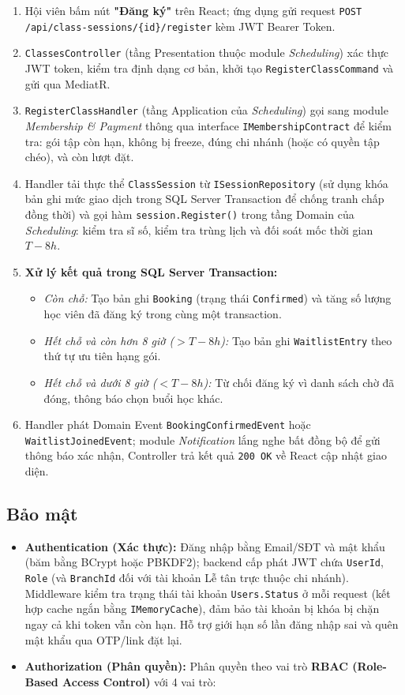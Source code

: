 \documentclass[a4paper,12pt]{article}
\begin{document}
\begin{enumerate}
    \item Hội viên bấm nút \textbf{"Đăng ký"} trên React; ứng dụng gửi request \texttt{POST /api/class-sessions/\{id\}/register} kèm JWT Bearer Token.
    \item \texttt{ClassesController} (tầng Presentation thuộc module \textit{Scheduling}) xác thực JWT token, kiểm tra định dạng cơ bản, khởi tạo \texttt{RegisterClassCommand} và gửi qua MediatR.
    \item \texttt{RegisterClassHandler} (tầng Application của \textit{Scheduling}) gọi sang module \textit{Membership \& Payment} thông qua interface \texttt{IMembershipContract} để kiểm tra: gói tập còn hạn, không bị freeze, đúng chi nhánh (hoặc có quyền tập chéo), và còn lượt đặt.
    \item Handler tải thực thể \texttt{ClassSession} từ \texttt{ISessionRepository} (sử dụng khóa bản ghi mức giao dịch trong SQL Server Transaction để chống tranh chấp đồng thời) và gọi hàm \texttt{session.Register()} trong tầng Domain của \textit{Scheduling}: kiểm tra sĩ số, kiểm tra trùng lịch và đối soát mốc thời gian $T-8h$.
    \item \textbf{Xử lý kết quả trong SQL Server Transaction:}
    \begin{itemize}
        \item \textit{Còn chỗ:} Tạo bản ghi \texttt{Booking} (trạng thái \texttt{Confirmed}) và tăng số lượng học viên đã đăng ký trong cùng một transaction.
        \item \textit{Hết chỗ và còn hơn 8 giờ ($> T-8h$):} Tạo bản ghi \texttt{WaitlistEntry} theo thứ tự ưu tiên hạng gói.
        \item \textit{Hết chỗ và dưới 8 giờ ($< T-8h$):} Từ chối đăng ký vì danh sách chờ đã đóng, thông báo chọn buổi học khác.
    \end{itemize}
    \item Handler phát Domain Event \texttt{BookingConfirmedEvent} hoặc \texttt{WaitlistJoinedEvent}; module \textit{Notification} lắng nghe bất đồng bộ để gửi thông báo xác nhận, Controller trả kết quả \texttt{200 OK} về React cập nhật giao diện.
\end{enumerate}

\subsection{Bảo mật}
\begin{itemize}
    \item \textbf{Authentication (Xác thực):} Đăng nhập bằng Email/SĐT và mật khẩu (băm bằng BCrypt hoặc PBKDF2); backend cấp phát JWT chứa \texttt{UserId}, \texttt{Role} (và \texttt{BranchId} đối với tài khoản Lễ tân trực thuộc chi nhánh). Middleware kiểm tra trạng thái tài khoản \texttt{Users.Status} ở mỗi request (kết hợp cache ngắn bằng \texttt{IMemoryCache}), đảm bảo tài khoản bị khóa bị chặn ngay cả khi token vẫn còn hạn. Hỗ trợ giới hạn số lần đăng nhập sai và quên mật khẩu qua OTP/link đặt lại.
    \item \textbf{Authorization (Phân quyền):} Phân quyền theo vai trò \textbf{RBAC (Role-Based Access Control)} với 4 vai trò:
\end{itemize}
\end{document}
